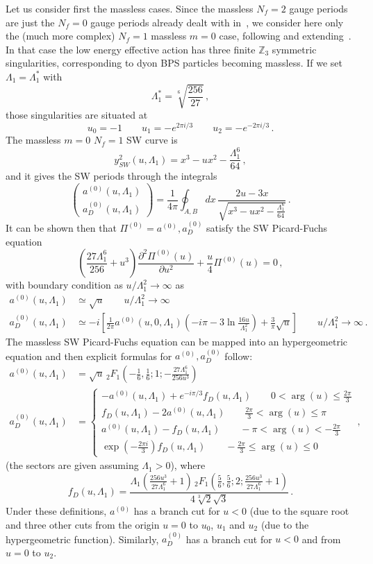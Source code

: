 \documentclass[11pt,a4paper]{elsarticle}
\def \ba {\begin{aligned}}
\def \ea {\end{aligned}}
\newcommand{\be}{\begin{equation}}
\newcommand{\ee}{\end{equation}}
\numberwithin{figure}{section}
\numberwithin{table}{section}
\begin{document}
Let us consider first the massless cases. Since the massless $N_f=2$ gauge periods are just the $N_f=0$ gauge periods already dealt with in~\cite{FioravantiGregori:2019}, we consider here only the (much more complex) $N_f=1$ massless $m=0$ case, following and extending~\cite{BilalFerrariQCD:1996}. In that case the low energy effective action has three finite $\mathbb{Z}_3$ symmetric singularities, corresponding to dyon BPS particles becoming massless. If we set $\Lambda_1 = \Lambda_1^*$ with
\be 
\Lambda_1^* = \sqrt[6]{\frac{256}{27}}\,,
\ee 
those singularities are situated at 
\be 
u_0 = - 1 \qquad u_1 = - e^{2\pi i/3} \qquad u_2 = - e^{-2\pi i/3}\,.
\ee 
The massless $m=0$ $N_f=1$ SW curve is
\be 
y_{SW}^2(u,\Lambda_1)= x^3-u x^2 - \frac{\Lambda_1^6}{64}\,,
\ee 
and it gives the SW periods through the integrals
\be 
\begin{pmatrix}a^{(0)}(u,\Lambda_1) \\a^{(0)}_D(u,\Lambda_1) \end{pmatrix}
=\frac{1}{4\pi} \oint_{A,B} dx\, \frac{2u - 3 x}{\sqrt{x^3-ux^2- \frac{\Lambda_1^6}{64}}} \,.
\ee 
It can be shown then that $\Pi^{(0)}=a^{(0)},a^{(0)}_D$ satisfy the SW Picard-Fuchs equation 
\be
\left(\frac{27 \Lambda_1^6}{256}+u^3 \right) \frac{\partial^2 \Pi^{(0)}(u)}{\partial u^2}+\frac{u}{4}\Pi^{(0)}(u)=0\,,
\ee
with boundary condition as $u/\Lambda_1^2 \to \infty$ as
\be
\ba
a^{(0)}(u, \Lambda_1) &\simeq   \sqrt{ u } \qquad u/\Lambda_1^2  \to \infty \\
a_D^{(0)}(u, \Lambda_1)&\simeq -i\left[\frac{1}{2\pi}a^{(0)}(u,0,\Lambda_1) \left(-i\pi - 3 \ln \frac{16 u}{\Lambda_1^2}\right)+\frac{3}{\pi}\sqrt{ u }\right]\qquad u/\Lambda_1^2  \to \infty\,.
\ea
\ee
The massless SW Picard-Fuchs equation can be mapped into an hypergeometric equation and then explicit formulas for $a^{(0)}, a^{(0)}_D$ follow:
\be 
\ba
a^{(0)}(u,\Lambda_1) &=  \sqrt{ u } \, _2F_1\left(-\frac{1}{6},\frac{1}{6};1;-\frac{27 \Lambda_1^6}{256 u^3}\right) \\
a_D^{(0)}(u,\Lambda_1) &= \begin{cases}
-a^{(0)}(u,\Lambda_1)+e^{-i \pi/3}f_D(u,\Lambda_1)\qquad0< \arg (u)\leq\frac{2 \pi }{3}\\
 f_D(u,\Lambda_1)-2 a^{(0)}(u,\Lambda_1)\qquad\frac{2 \pi }{3}< \arg (u)\leq\pi \\
 a^{(0)}(u,\Lambda_1)-f_D(u,\Lambda_1)\qquad-\pi < \arg (u)<-\frac{2 \pi }{3}\\ 
 \exp \left(-\frac{2 \pi  i}{3}\right) f_D(u,\Lambda_1)\qquad-\frac{2 \pi }{3}\leq \arg (u)\leq0
\end{cases}\,,
\ea
\ee
(the sectors are given assuming $\Lambda_1 >0$), where
\be
f_D(u,\Lambda_1)= \frac{   \Lambda_1 \left(\frac{256 u^3}{27 \Lambda_1^6}+1\right) \, _2F_1\left(\frac{5}{6},\frac{5}{6};2;\frac{256 u^3}{27 \Lambda_1^6}+1\right)}{4  \sqrt[3]{2}  \sqrt{3}}\,.
\ee
Under these definitions, $a^{(0)} $ has a branch cut for $u<0$ (due to the square root and three other cuts from the origin $u=0$ to $u_0$, $u_1$ and $u_2$ (due to the hypergeometric function). Similarly, $a^{(0)}_D$ has a branch cut for $u<0$ and from $u=0$ to $u_2$.
\end{document}
